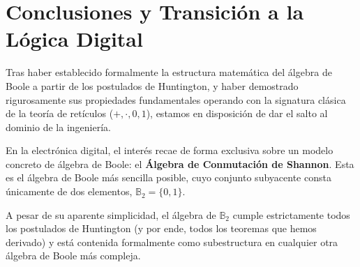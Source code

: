 \section{Conclusiones y Transición a la Lógica Digital}

Tras haber establecido formalmente la estructura matemática del álgebra de Boole a partir de los postulados de Huntington, y haber demostrado rigurosamente sus propiedades fundamentales operando con la signatura clásica de la teoría de retículos ($+, \cdot, 0, 1$), estamos en disposición de dar el salto al dominio de la ingeniería.

En la electrónica digital, el interés recae de forma exclusiva sobre un modelo concreto de álgebra de Boole: el \textbf{Álgebra de Conmutación de Shannon}. Esta es el álgebra de Boole más sencilla posible, cuyo conjunto subyacente consta únicamente de dos elementos, $\mathbb{B}_2 = \{0, 1\}$. 

A pesar de su aparente simplicidad, el álgebra de $\mathbb{B}_2$ cumple estrictamente todos los postulados de Huntington (y por ende, todos los teoremas que hemos derivado) y está contenida formalmente como subestructura en cualquier otra álgebra de Boole más compleja.

